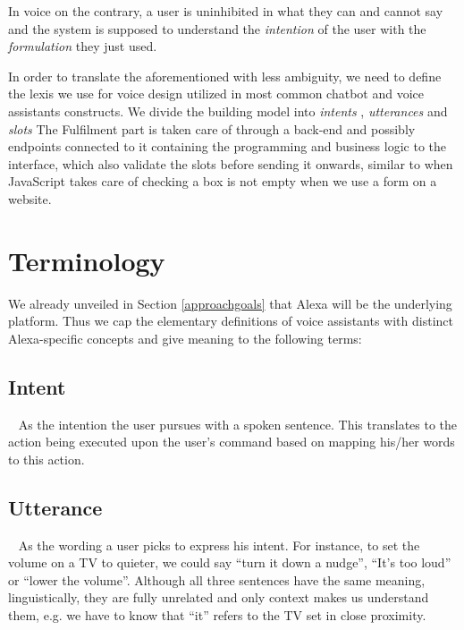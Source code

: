 %  

In voice on the contrary, a user is uninhibited in what they can and cannot say and the system is supposed to understand the \textit{intention} %
of the user with the \textit{formulation} %
they just used.

In order to translate the aforementioned with less ambiguity, we need to define the lexis we use for voice design utilized in most common chatbot and voice assistants constructs. 
We divide the building model into \textit{intents}%
, \textit{utterances} %
 and \textit{slots} %
The Fulfilment part is taken care of through a back-end and possibly endpoints connected to it containing the programming and business logic to the interface, which also validate the slots before sending it onwards, similar to when JavaScript takes care of checking a box is not empty when we use a form on%
a website. %

\section{Terminology}
We already unveiled in Section \ref{approachgoals} that Alexa will be the underlying platform. Thus we cap the elementary definitions of voice assistants with distinct Alexa-specific concepts and give meaning to the following terms: 

	\subsection*{Intent}~\label{intents}
	As the intention the user pursues with a spoken sentence. This translates to the action being executed upon the user's command based on mapping his/her words to this action.
	
	\subsection*{Utterance}~\label{utterances}
	As the wording a user picks to express his intent. For instance, to set the volume on a TV to quieter, we could say ``turn it down a nudge'', ``It's too loud'' or ``lower the volume''. Although all three sentences have the same meaning, linguistically, they are fully unrelated and only context makes us understand them, e.g. we have to know that ``it'' refers to the TV set in close proximity.
	
